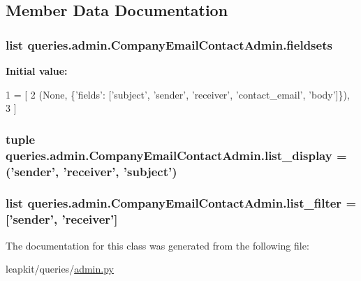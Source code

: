 \subsection{Member Data Documentation}
\hypertarget{classqueries_1_1admin_1_1_company_email_contact_admin_ac8ece5196b38279d36a2d25d807c9865}{
\subsubsection[{fieldsets}]{\setlength{\rightskip}{0pt plus 5cm}list queries.\-admin.\-Company\-Email\-Contact\-Admin.\-fieldsets\hspace{0.3cm}{\ttfamily [static]}}}\label{classqueries_1_1admin_1_1_company_email_contact_admin_ac8ece5196b38279d36a2d25d807c9865}
{\bfseries Initial value\-:}
\begin{DoxyCode}
1 = [
2         (\textcolor{keywordtype}{None}, \{\textcolor{stringliteral}{'fields'}: [\textcolor{stringliteral}{'subject'}, \textcolor{stringliteral}{'sender'}, \textcolor{stringliteral}{'receiver'}, \textcolor{stringliteral}{'contact\_email'},  \textcolor{stringliteral}{'body'}]\}),
3     ]
\end{DoxyCode}
\hypertarget{classqueries_1_1admin_1_1_company_email_contact_admin_a1ee681d33eb8e3daaba7cfb1a1389336}{
\subsubsection[{list\-\_\-display}]{\setlength{\rightskip}{0pt plus 5cm}tuple queries.\-admin.\-Company\-Email\-Contact\-Admin.\-list\-\_\-display = ('sender', 'receiver', 'subject')\hspace{0.3cm}{\ttfamily [static]}}}\label{classqueries_1_1admin_1_1_company_email_contact_admin_a1ee681d33eb8e3daaba7cfb1a1389336}
\hypertarget{classqueries_1_1admin_1_1_company_email_contact_admin_a81b9dece41d8b13566d9abb5d7efcae0}{
\subsubsection[{list\-\_\-filter}]{\setlength{\rightskip}{0pt plus 5cm}list queries.\-admin.\-Company\-Email\-Contact\-Admin.\-list\-\_\-filter = \mbox{[}'sender', 'receiver'\mbox{]}\hspace{0.3cm}{\ttfamily [static]}}}\label{classqueries_1_1admin_1_1_company_email_contact_admin_a81b9dece41d8b13566d9abb5d7efcae0}


The documentation for this class was generated from the following file\-:\begin{DoxyCompactItemize}
\item 
leapkit/queries/\hyperlink{queries_2admin_8py}{admin.\-py}\end{DoxyCompactItemize}
